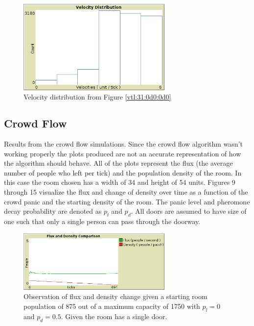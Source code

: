 \documentclass{article}%
\begin{document}
    \begin{figure}[ht!]
        \centering
        \includegraphics[width=3in]{../img/VelDistroTwoLane_pb0pa0.png}
        \caption{Velocity distribution from Figure \ref{vtl:31:0d0:0d0}}
        \label{vtl:d31:0d0:0d0}
    \end{figure}

    \subsection{ Crowd Flow }
    Results from the crowd flow simulations. Since the crowd flow algorithm wasn't working properly the plots produced are not an accurate representation of how the algorithm should behave. All of the plots represent the flux (the average number of people who left per tick) and the population density of the room. In this case the room chosen has a width of 34 and height of 54 units. Figures 9 through 15 visualize the flux and change of density over time as a function of the crowd panic and the starting density of the room. The panic level and pheromone decay probability are denoted as $p_l$ and $p_d$. All doors are assumed to have size of one such that only a single person can pass through the doorway. 

    \begin{figure}[ht!]
        \centering
        \includegraphics[width=3in]{../img/Crowd34x541d_pl0pd0d5.png}
        \caption{ Observation of flux and density change given a starting room population of 875 out of a maximum capacity of 1750 with $p_l = 0$ and $p_d = 0.5$. Given the room has a single door.}
        \label{crd:d1:pl0:pd0d5}
    \end{figure}
\end{document}
